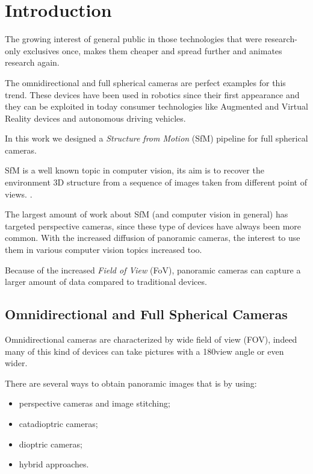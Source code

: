 \chapter{Introduction}
The growing interest of general public in those technologies that were 
research-only exclusives once, makes them cheaper and spread further and
animates research again.

The omnidirectional and full spherical cameras are perfect examples 
for this trend.
These devices have been used in robotics since their first appearance and they 
can be exploited in today consumer technologies like Augmented and Virtual 
Reality devices and autonomous driving vehicles.

In this work we designed a \textit{Structure from Motion} (SfM) pipeline for 
full spherical cameras.

SfM is a well known topic in computer vision, its aim is to recover the 
environment 3D structure from a sequence of images taken from different point 
of views. .

The largest amount of work about SfM (and computer vision in general) 
has targeted  perspective cameras, since these type of devices 
have always been more common.
With the increased diffusion of panoramic cameras, the interest to use them in 
various computer vision topics increased too.

Because of the increased \textit{Field of View} (FoV), panoramic cameras can 
capture a larger amount of data compared to traditional devices.


\section{Omnidirectional and Full Spherical Cameras}
\label{sec:cameraclassification}
Omnidirectional cameras are characterized by wide field of view (FOV), 
indeed many of this kind
of devices can take pictures with a 180\degree view angle or even wider.

There are several ways to obtain panoramic images that is by using:
\begin{itemize}
	\item perspective cameras and image stitching;
	\item catadioptric cameras;
	\item dioptric cameras;
	\item hybrid approaches.
\end{itemize}


